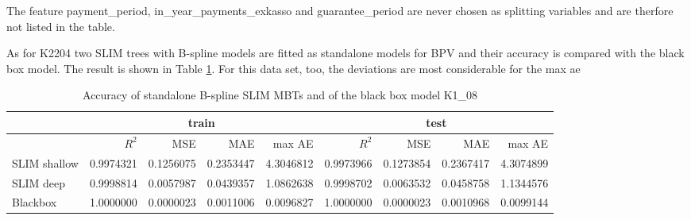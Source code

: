 The feature payment\_period, in\_year\_payments\_exkasso and guarantee\_period are never chosen as splitting variables and are therfore not listed in the table.


As for K2204 two SLIM trees with B-spline models are fitted as  standalone models for BPV and their accuracy is compared with the black box model. The result is shown in Table \ref{tab:ins_k108_standalone_slim}. For this data set, too, the deviations are most considerable for the max ae





\begin{table}[!htb]

\centering \scriptsize  
\begin{tabular}[t]{l|r|r|r|r|r|r|r|r}
\hline
 & \multicolumn{4}{|c|}{train} & \multicolumn{4}{|c}{test} \\
\hline
 & $R^2$ & MSE & MAE & max AE & $R^2$ & MSE & MAE & max AE \\
\hline
SLIM shallow & 0.9974321 & 0.1256075 & 0.2353447 & 4.3046812 & 0.9973966 & 0.1273854 & 0.2367417 & 4.3074899\\
SLIM deep & 0.9998814 & 0.0057987 & 0.0439357 & 1.0862638 & 0.9998702 & 0.0063532 & 0.0458758 & 1.1344576\\
Blackbox & 1.0000000 & 0.0000023 & 0.0011006 & 0.0096827 & 1.0000000 & 0.0000023 & 0.0010968 & 0.0099144\\
\hline
\end{tabular}
\caption{Accuracy of standalone B-spline SLIM MBTs and of the black box model K1\_08}
\label{tab:ins_k108_standalone_slim}
\end{table}